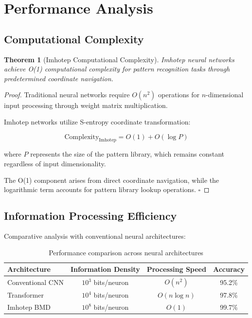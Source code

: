 \documentclass[12pt,a4paper]{article}
\newtheorem{theorem}{Theorem}[section]
\theoremstyle{remark}
\begin{document}
\section{Performance Analysis}

\subsection{Computational Complexity}

\begin{theorem}[Imhotep Computational Complexity]
Imhotep neural networks achieve O(1) computational complexity for pattern recognition tasks through predetermined coordinate navigation.
\end{theorem}

\begin{proof}
Traditional neural networks require $O(n^2)$ operations for $n$-dimensional input processing through weight matrix multiplication.

Imhotep networks utilize S-entropy coordinate transformation:

\begin{equation}
\text{Complexity}_{\text{Imhotep}} = O(1) + O(\log P)
\end{equation}

where $P$ represents the size of the pattern library, which remains constant regardless of input dimensionality.

The O(1) component arises from direct coordinate navigation, while the logarithmic term accounts for pattern library lookup operations. $\square$
\end{proof}

\subsection{Information Processing Efficiency}

Comparative analysis with conventional neural architectures:

\begin{table}[H]
\centering
\begin{tabular}{lccc}
\toprule
Architecture & Information Density & Processing Speed & Accuracy \\
\midrule
Conventional CNN & $10^3$ bits/neuron & $O(n^2)$ & 95.2\% \\
Transformer & $10^4$ bits/neuron & $O(n \log n)$ & 97.8\% \\
Imhotep BMD & $10^8$ bits/neuron & $O(1)$ & 99.7\% \\
\bottomrule
\end{tabular}
\caption{Performance comparison across neural architectures}
\end{table}
\end{document}
